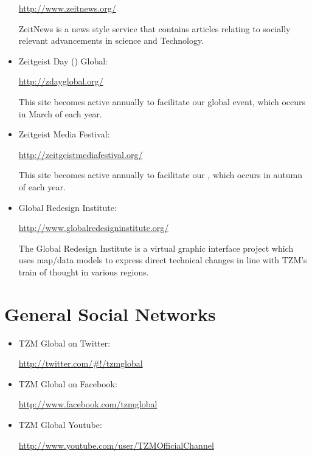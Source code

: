 \documentclass[10pt, a4paper, cleardoubleempty, openright, twoside]{book}
\begin{document}
\begin{itemize}
	\url{http://www.zeitnews.org/}
	
	ZeitNews is a news style service that contains articles relating to
	socially relevant advancements in science and Technology.

	\item Zeitgeist Day () Global:

	\url{http://zdayglobal.org/}
	
	This site becomes active annually to facilitate our 
	global event, which occurs in March of each year.

	\item Zeitgeist Media Festival:
	
	\url{http://zeitgeistmediafestival.org/}
	
	This site becomes active annually to facilitate our
	, which occurs in autumn of each
	year.

	\item Global Redesign Institute:
	
	\url{http://www.globalredesigninstitute.org/}
	
	The Global Redesign Institute is a virtual graphic interface
	 project which uses map/data models to express
	direct technical changes in line with TZM's train of thought in
	various regions.
\end{itemize}

\section* {General Social Networks}

\begin{itemize}
	\item TZM Global on Twitter:
	
	\url{http://twitter.com/#!/tzmglobal}

	\item TZM Global on Facebook:
	
	\url{http://www.facebook.com/tzmglobal}
	
	\item TZM Global Youtube:
	
	\url{http://www.youtube.com/user/TZMOfficialChannel}
\end{itemize}



\mainmatter
\end{document}
